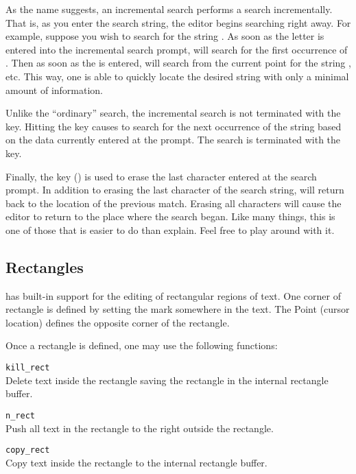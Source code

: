   As the name suggests, an incremental search performs a search
  incrementally. That is, as you enter the search string, the editor begins
  searching right away.  For example, suppose you wish to search for the
  string . As soon as the letter  is entered into the
  incremental search prompt, \jed{} will search for the first occurrence of
  . Then as soon as the  is entered, \jed{} will search from the
  current point for the string , etc. This way, one is able to
  quickly locate the desired string with only a minimal amount of
  information.

  Unlike the ``ordinary'' search, the incremental search is not terminated
  with the  key.  Hitting the  key causes \jed{} to
  search for the next occurrence of the string based on the data currently
  entered at the prompt.  The search is terminated with the  key.

  Finally, the  key () is used to erase the last
  character entered at the search prompt.  In addition to erasing the last
  character of the search string, \jed{} will return back to the location of
  the previous match. Erasing all characters will cause the editor to return
  to the place where the search began.  Like many things, this is one of
  those that is easier to do than explain.  Feel free to play around with
  it.

\subsection{Rectangles}

  \jed{} has built-in support for the editing of rectangular regions of
  text. One corner of rectangle is defined by setting the mark somewhere in
  the text.  The Point (cursor location) defines the opposite corner of the
  rectangle.

  Once a rectangle is defined, one may use the following functions:

      \verb|kill_rect|\\
         Delete text inside the rectangle saving the rectangle
         in the internal rectangle buffer.
         
      \verb|n_rect|\\
         Push all text in the rectangle to the right outside the
         rectangle.
         
      \verb|copy_rect|\\
         Copy text inside the rectangle to the internal rectangle
         buffer.
         
